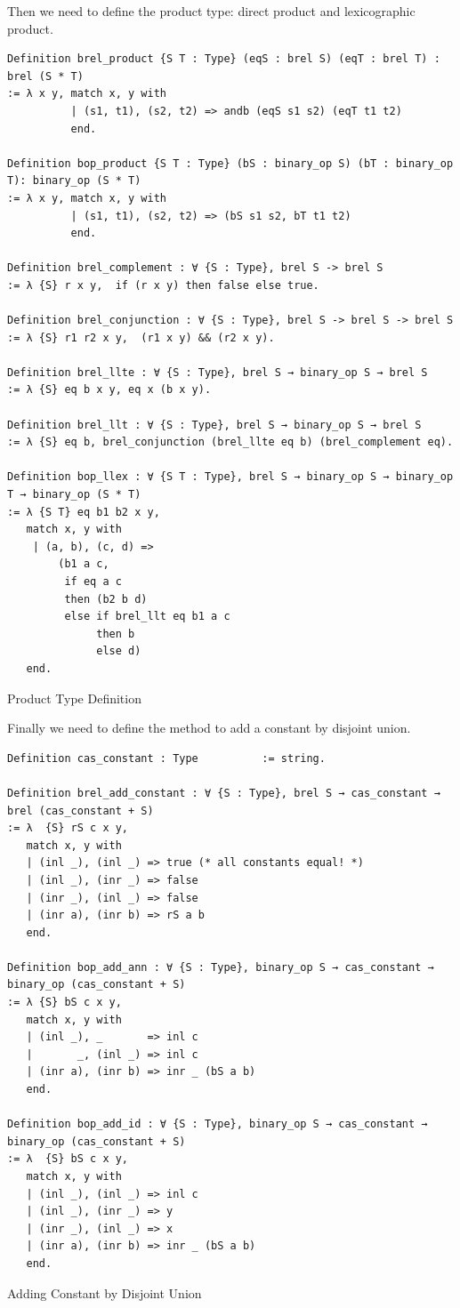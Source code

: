 \documentclass[a4paper,12pt,twoside,openright]{report}
\begin{document}
Then we need to define the product type: direct product and lexicographic product.
\begin{listing}[H]
\begin{verbatim}
Definition brel_product {S T : Type} (eqS : brel S) (eqT : brel T) : brel (S * T)
:= λ x y, match x, y with
          | (s1, t1), (s2, t2) => andb (eqS s1 s2) (eqT t1 t2) 
          end.
          
Definition bop_product {S T : Type} (bS : binary_op S) (bT : binary_op T): binary_op (S * T) 
:= λ x y, match x, y with
          | (s1, t1), (s2, t2) => (bS s1 s2, bT t1 t2) 
          end.
          
Definition brel_complement : ∀ {S : Type}, brel S -> brel S 
:= λ {S} r x y,  if (r x y) then false else true. 
   
Definition brel_conjunction : ∀ {S : Type}, brel S -> brel S -> brel S 
:= λ {S} r1 r2 x y,  (r1 x y) && (r2 x y). 
   
Definition brel_llte : ∀ {S : Type}, brel S → binary_op S → brel S 
:= λ {S} eq b x y, eq x (b x y). 
   
Definition brel_llt : ∀ {S : Type}, brel S → binary_op S → brel S 
:= λ {S} eq b, brel_conjunction (brel_llte eq b) (brel_complement eq). 
 
Definition bop_llex : ∀ {S T : Type}, brel S → binary_op S → binary_op T → binary_op (S * T) 
:= λ {S T} eq b1 b2 x y,  
   match x, y with
    | (a, b), (c, d) => 
        (b1 a c, 
         if eq a c 
         then (b2 b d)
         else if brel_llt eq b1 a c 
              then b 
              else d)
   end.
\end{verbatim}
\caption{Product Type Definition} 
\label{coq:def:product}
\end{listing}

Finally we need to define the method to add a constant by disjoint union.

\begin{listing}[H]
\begin{verbatim}
Definition cas_constant : Type          := string.   

Definition brel_add_constant : ∀ {S : Type}, brel S → cas_constant → brel (cas_constant + S)
:= λ  {S} rS c x y, 
   match x, y with
   | (inl _), (inl _) => true (* all constants equal! *) 
   | (inl _), (inr _) => false 
   | (inr _), (inl _) => false 
   | (inr a), (inr b) => rS a b 
   end.
   
Definition bop_add_ann : ∀ {S : Type}, binary_op S → cas_constant → binary_op (cas_constant + S)
:= λ {S} bS c x y, 
   match x, y with
   | (inl _), _       => inl c
   |       _, (inl _) => inl c
   | (inr a), (inr b) => inr _ (bS a b)
   end.
   
Definition bop_add_id : ∀ {S : Type}, binary_op S → cas_constant → binary_op (cas_constant + S)
:= λ  {S} bS c x y, 
   match x, y with
   | (inl _), (inl _) => inl c 
   | (inl _), (inr _) => y
   | (inr _), (inl _) => x
   | (inr a), (inr b) => inr _ (bS a b)
   end.
\end{verbatim}
\caption{Adding Constant by Disjoint Union} 
\label{coq:def:add_constant}
\end{listing}
\end{document}
